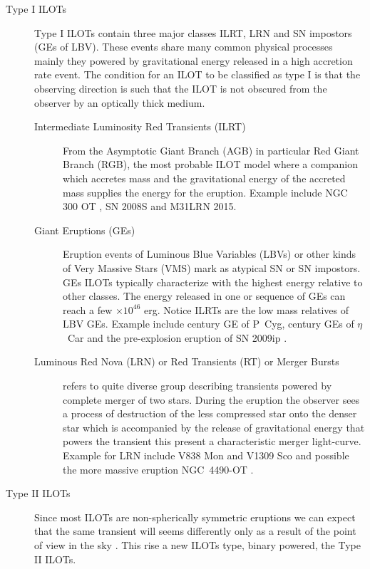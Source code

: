 \documentclass[a4paper,12pt,modern]{aastex62}
\begin{document}
\begin{description}
\item[Type I ILOTs] Type I ILOTs contain three major classes ILRT, LRN and SN impostors (GEs of LBV). These events share many common physical processes mainly they powered by gravitational energy released in a high accretion rate event. The condition for an ILOT to be classified as type I is that the observing direction is such that the ILOT is not obscured from the observer by an optically thick medium.
\begin{description}
\item[Intermediate Luminosity Red Transients (ILRT)] From the Asymptotic Giant Branch (AGB) in particular Red Giant Branch (RGB), the most probable ILOT model where a companion which accretes mass and the gravitational energy of the accreted mass supplies the energy for the eruption. Example include NGC 300 OT \citep{2010ApJ...709L..11K}, SN 2008S and M31LRN 2015.
\item[Giant Eruptions (GEs)] Eruption events of Luminous Blue Variables (LBVs) or other kinds of Very Massive Stars (VMS) mark as atypical SN or SN impostors. GEs ILOTs typically characterize with the highest energy relative to other classes. The energy released in one or sequence of GEs can reach a few $\times10^{46}$ erg. Notice ILRTs are the low mass relatives of LBV GEs. Example include  century GE of P~Cyg,  century GEs of $\eta$~Car and the pre-explosion eruption of SN 2009ip \cite{2016MNRAS.463.2904S}. 
\item[Luminous Red Nova (LRN) or Red Transients (RT) or Merger Bursts] refers to quite diverse group describing transients powered by complete merger of two stars. During the eruption the observer sees a process of destruction of the less compressed star onto the denser star which is accompanied by the release of gravitational energy that powers the transient this present a characteristic merger light-curve. Example for LRN include V838 Mon \cite{2005A&A...441.1099T} and V1309 Sco \cite{2011A&A...528A.114T} and possible the more massive eruption NGC~4490-OT \cite{2016MNRAS.458..950S}.
\end{description}
\item[Type II ILOTs]  Since most ILOTs are non-spherically symmetric eruptions we can expect that the same transient will seems differently only as a result of the point of view in the sky \cite{2017MNRAS.467.3299K}. This rise a new ILOTs type, binary powered, the Type II ILOTs.

\end{description}
\end{document}
